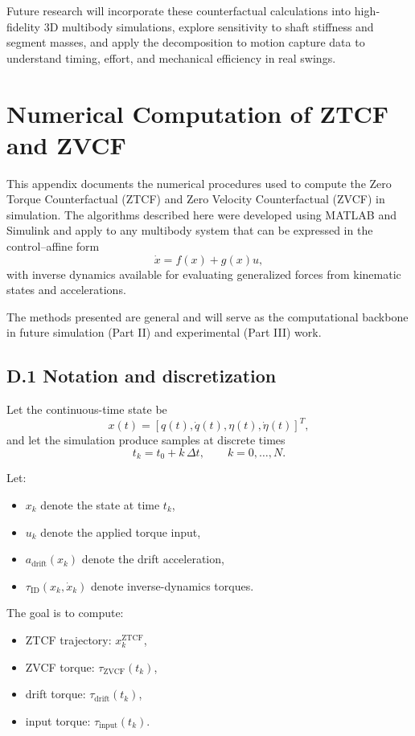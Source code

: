 \documentclass[12pt]{article}
\begin{document}
Future research will incorporate these counterfactual calculations into high‐fidelity 3D multibody simulations, explore sensitivity to shaft stiffness and segment masses, and apply the decomposition to motion capture data to understand timing, effort, and mechanical efficiency in real swings.
\section{Numerical Computation of ZTCF and ZVCF}
\label{app:ztcf_zvcf}

This appendix documents the numerical procedures used to compute the Zero Torque Counterfactual (ZTCF) and Zero Velocity Counterfactual (ZVCF) in simulation. The algorithms described here were developed using MATLAB and Simulink and apply to any multibody system that can be expressed in the control–affine form
\[
  \dot{x} = f(x) + g(x)u,
\]
with inverse dynamics available for evaluating generalized forces from kinematic states and accelerations.

The methods presented are general and will serve as the computational backbone in future simulation (Part II) and experimental (Part III) work.

\subsection{D.1 \quad Notation and discretization}

Let the continuous-time state be
\[
  x(t) = [q(t),\dot{q}(t),\eta(t),\dot{\eta}(t)]^T,
\]
and let the simulation produce samples at discrete times
\[
  t_k = t_0 + k\,\Delta t, \qquad k = 0,\dots,N.
\]

Let:
\begin{itemize}
  \item \(x_k\)   denote the state at time \(t_k\),
  \item \(u_k\)   denote the applied torque input,
  \item \(a_{\mathrm{drift}}(x_k)\) denote the drift acceleration,
  \item \(\tau_{\mathrm{ID}}(x_k,\dot{x}_k)\) denote inverse-dynamics torques.
\end{itemize}

The goal is to compute:
\begin{itemize}
  \item ZTCF trajectory:   \(x^{\mathrm{ZTCF}}_k\),
  \item ZVCF torque:       \(\tau_{\mathrm{ZVCF}}(t_k)\),
  \item drift torque:      \(\tau_{\mathrm{drift}}(t_k)\),
  \item input torque:      \(\tau_{\mathrm{input}}(t_k)\).
\end{itemize}
\end{document}
